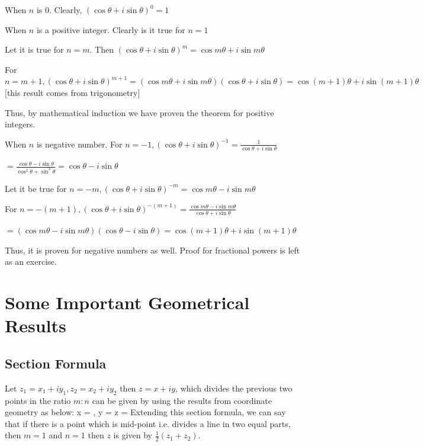  When $n$ is $0$. Clearly, $(\cos\theta + i\sin\theta)^0 = 1$

 When $n$ is a positive integer. Clearly is it true for $n = 1$

\noindent Let it is true for $n = m$. Then $(\cos\theta + i\sin\theta)^m = \cos m\theta + i\sin m\theta$

\noindent For $n = m + 1, (\cos\theta + i\sin\theta)^{m + 1} = (\cos m\theta + i\sin m\theta)(\cos\theta + i\sin\theta) = \cos(m + 1)\theta +
i\sin(m + 1)\theta$ [this result comes from trigonometry]

\noindent Thus, by mathematical induction we have proven the theorem for positive integers.

 When $n$ is negative number. For $n = -1, (\cos\theta + i\sin\theta)^{-1} = \frac{1}{\cos\theta +
  i\sin\theta}$

\noindent $= \frac{\cos\theta - i\sin\theta}{\cos^2\theta + \sin^2\theta} = \cos\theta - i\sin\theta$

\noindent Let it be true for $n = -m, (\cos\theta + i\sin\theta)^{-m} = \cos m\theta - i\sin m\theta$

\noindent For $n = -(m + 1), (\cos\theta + i\sin\theta)^{-(m + 1)} = \frac{\cos m\theta - i\sin m\theta}{\cos\theta + i\sin\theta}$

\noindent $= (\cos m\theta - i\sin m\theta)(\cos\theta - i\sin\theta) = \cos(m + 1)\theta + i\sin(m + 1)\theta$

Thus, it is proven for negative numbers as well. Proof for fractional powers is left as an exercise.

\section{Some Important Geometrical Results}
\subsection{Section Formula}
Let $z_1 = x_1 + iy_1, z_2 = x_2 + iy_2$ then $z = x + iy$, which divides the
previous two points in the ratio $m:n$ can be given
by using the results from coordinate geometry as below:
\startformula x = , y =  \;\;z = \stopformula
Extending this section formula, we can say that if there is a point which is mid-point i.e. divides a line in two equal parts, then
$m = 1$ and $n = 1$ then $z$ is given by $\frac{1}{2}(z_1 + z_2)$.
